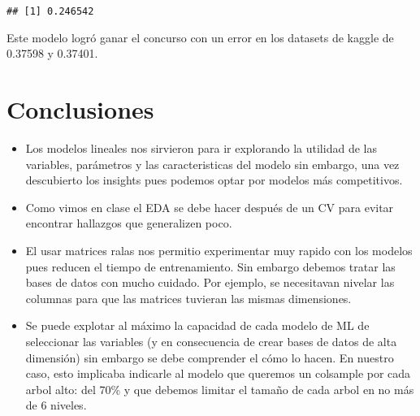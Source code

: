 \documentclass[
]{book}
\begin{document}
\begin{verbatim}
## [1] 0.246542
\end{verbatim}

Este modelo logró ganar el concurso con un error en los datasets de kaggle de 0.37598 y 0.37401.

\hypertarget{conclusiones}{%
\chapter{Conclusiones}\label{conclusiones}}

\begin{itemize}
\item
  Los modelos lineales nos sirvieron para ir explorando la utilidad de las variables, parámetros y las caracteristicas del modelo sin embargo, una vez descubierto los insights pues podemos optar por modelos más competitivos.
\item
  Como vimos en clase el EDA se debe hacer después de un CV para evitar encontrar hallazgos que generalizen poco.
\item
  El usar matrices ralas nos permitio experimentar muy rapido con los modelos pues reducen el tiempo de entrenamiento. Sin embargo debemos tratar las bases de datos con mucho cuidado. Por ejemplo, se necesitavan nivelar las columnas para que las matrices tuvieran las mismas dimensiones.
\item
  Se puede explotar al máximo la capacidad de cada modelo de ML de seleccionar las variables (y en consecuencia de crear bases de datos de alta dimensión) sin embargo se debe comprender el cómo lo hacen. En nuestro caso, esto implicaba indicarle al modelo que queremos un colsample por cada arbol alto: del 70\% y que debemos limitar el tamaño de cada arbol en no más de 6 niveles.
\end{itemize}

  
\end{document}
